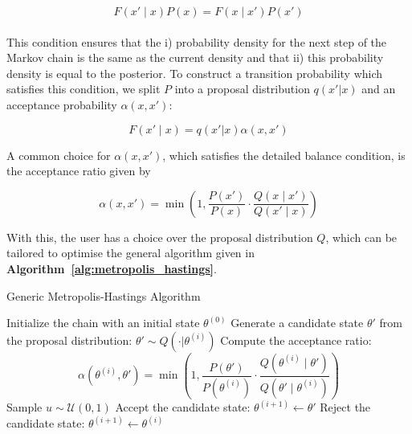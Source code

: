 \begin{equation}
\label{eq:db}
F(x' \mid x)P(x)=  F(x\mid x')P(x')
\end{equation}

\paragraph{}This condition ensures that the i) probability density for the next step of the Markov chain is the same as the current density and that ii) this probability density is equal to the posterior.  To construct a transition probability which satisfies this condition, we split $P$ into a proposal distribution $q(x' | x)$ and an acceptance probability $\alpha(x, x')$:

\begin{equation}
F(x' \mid x) = q(x' | x)\alpha(x, x')
\end{equation}

A common choice for $\alpha(x, x')$, which satisfies the detailed balance condition, is the acceptance ratio given by 

\begin{equation}
\label{eq:alpha}
        \alpha(x, x') = \min\left(1, \frac{P(x')}{P(x)} \cdot \frac{Q(x \mid x')}{Q(x' \mid x)}\right)
 \end{equation}

With this, the user has a choice over the proposal distribution $Q$, which can be tailored to optimise the general algorithm given in \textbf{Algorithm~\ref{alg:metropolis_hastings}}.

\begin{algorithm}[H]
\caption{Generic Metropolis-Hastings Algorithm}
\label{alg:metropolis_hastings}
\begin{algorithmic}[1]
    \State Initialize the chain with an initial state $\theta^{(0)}$
        \State Generate a candidate state $\theta'$ from the proposal distribution: $\theta' \sim Q(\cdot | \theta^{(i)})$
        \State Compute the acceptance ratio:
        \[
        \alpha(\theta^{(i)}, \theta') = \min\left(1, \frac{P(\theta')}{P(\theta^{(i)})} \cdot \frac{Q(\theta^{(i)} \mid \theta')}{Q(\theta' \mid \theta^{(i)})}\right)
        \]
        \State Sample $u \sim \mathcal{U}(0, 1)$
            \State Accept the candidate state: $\theta^{(i+1)} \leftarrow \theta'$
        \Else
            \State Reject the candidate state: $\theta^{(i+1)} \leftarrow \theta^{(i)}$
        \EndIf
    \EndFor
\end{algorithmic}
\end{algorithm}



